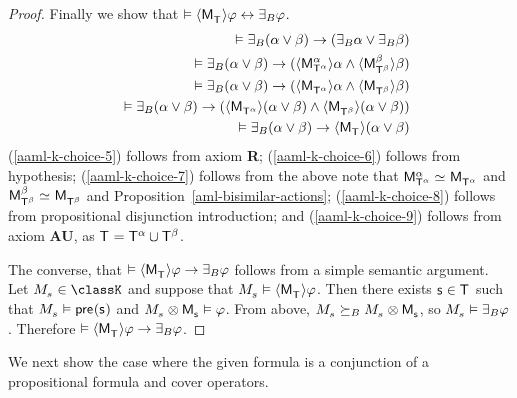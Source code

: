 \begin{proof}
Finally we show that $\entails \actionE{\aPModel{\aStatesT}} \phi \iff \someactsBs \phi$.
\begin{eqnarray}
    &&\entails \someactsBs (\alpha \lor \beta) \implies (\someactsBs \alpha \lor \someactsBs \beta) \label{aaml-k-choice-5}\\
    &&\entails \someactsBs (\alpha \lor \beta) \implies (\actionE{\aPModel[\alpha]{\aStatesT[\alpha]}} \alpha \land \actionE{\aPModel[\beta]{\aStatesT[\beta]}} \beta) \label{aaml-k-choice-6}\\
    &&\entails \someactsBs (\alpha \lor \beta) \implies (\actionE{\aPModel{\aStatesT[\alpha]}} \alpha \land \actionE{\aPModel{\aStatesT[\beta]}} \beta) \label{aaml-k-choice-7}\\
    &&\entails \someactsBs (\alpha \lor \beta) \implies (\actionE{\aPModel{\aStatesT[\alpha]}} (\alpha \lor \beta) \land \actionE{\aPModel{\aStatesT[\beta]}} (\alpha \lor \beta)) \label{aaml-k-choice-8}\\
    &&\entails \someactsBs (\alpha \lor \beta) \implies \actionE{\aPModel{\aStatesT}} (\alpha \lor \beta) \label{aaml-k-choice-9}
\end{eqnarray}
(\ref{aaml-k-choice-5}) follows from \axiomAamlK{} axiom {\bf R};
(\ref{aaml-k-choice-6}) follows from hypothesis;
(\ref{aaml-k-choice-7}) follows from the above note that $\aPModel[\alpha]{\aStatesT[\alpha]} \bisimilar \aPModel{\aStatesT[\alpha]}$ and $\aPModel[\beta]{\aStatesT[\beta]} \bisimilar \aPModel{\aStatesT[\beta]}$ and Proposition~\ref{aml-bisimilar-actions};
(\ref{aaml-k-choice-8}) follows from propositional disjunction introduction; and
(\ref{aaml-k-choice-9}) follows from \axiomAamlK{} axiom {\bf AU}, as $\aStatesT = \aStatesT[\alpha] \cup \aStatesT[\beta]$.

The converse, that $\entails \actionE{\aPModel{\aStatesT}} \phi \implies \someactsBs \phi$ follows from a simple semantic argument.
Let $\kPModel{\kStateS} \in \classK$ and suppose that $\kPModel{\kStateS} \entails \actionE{\aPModel{\aStatesT}} \phi$.
Then there exists $\aStateS \in \aStatesT$ such that $\kPModel{\kStateS} \entails \aPrecondition(\aStateS)$ and $\kPModel{\kStateS} \exec \aPModel{\aStateS} \entails \phi$.
From above, $\kPModel{\kStateS} \simulatesBs \kPModel{\kStateS} \exec \aPModel{\aStateS}$, so $\kPModel{\kStateS} \entails \someactsBs \phi$.
Therefore $\entails \actionE{\aPModel{\aStatesT}} \phi \implies \someactsBs \phi$.
\end{proof}

We next show the case where the given formula is a conjunction of a propositional formula and cover operators.

